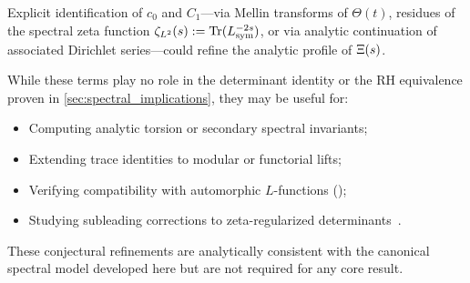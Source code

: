 Explicit identification of \( c_0 \) and \( C_1 \)—via Mellin transforms of \( \Theta(t) \), residues of the spectral zeta function \( \zeta_{L^2}(s) := \operatorname{Tr}(L_{\mathrm{sym}}^{-2s}) \), or via analytic continuation of associated Dirichlet series—could refine the analytic profile of \( \Xi(s) \).

While these terms play no role in the determinant identity or the RH equivalence proven in \cref{sec:spectral_implications}, they may be useful for:

\begin{itemize}
  \item Computing analytic torsion or secondary spectral invariants;
  \item Extending trace identities to modular or functorial lifts;
  \item Verifying compatibility with automorphic \( L \)-functions ();
  \item Studying subleading corrections to zeta-regularized determinants~\cite{Elizalde1994ZetaRegularization}.
\end{itemize}

\medskip
\noindent
These conjectural refinements are analytically consistent with the canonical spectral model developed here but are not required for any core result.
